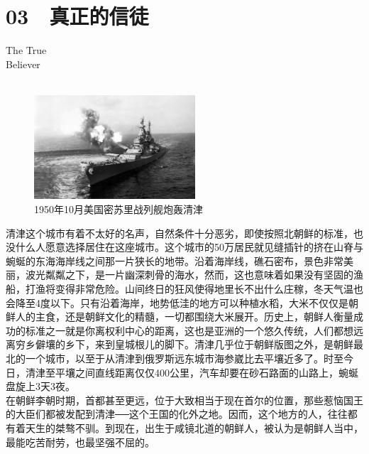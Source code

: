 \fancyhead[RO]{{\tiny{\textcolor{Gray}{\FA \ }}}\thepage}
\fancyhead[LE]{{\tiny{\textcolor{Gray}{\FA \ }}}\thepage}
\fancyfoot[LE,RO]{}
\fancyfoot[LO,CE]{}
\fancyfoot[CO,RE]{}
\chapter*{03 {\FA } 真正的信徒}
\vspace{5mm}
\begin{flushright}
	\textcolor{PinYinColor}{\EN \huge{The True\\
		Believer\\
	\ \\}}
\end{flushright}
\begin{figure}[!htbp]
	\centering
	\includegraphics[width=6cm]{./Chapters/Images/03.jpg}
	\caption*{1950年10月美国密苏里战列舰炮轰清津}
\end{figure}

清津这个城市有着不太好的名声，自然条件十分恶劣，即使按照北朝鲜的标准，也没什么人愿意选择居住在这座城市。这个城市的50万居民就见缝插针的挤在山脊与蜿蜒的东海海岸线之间那一片狭长的地带。沿着海岸线，礁石密布，景色非常美丽，波光粼粼之下，是一片幽深刺骨的海水，然而，这也意味着如果没有坚固的渔船，打渔将变得非常危险。山间终日的狂风使得地里长不出什么庄稼，冬天气温也会降至4度以下。只有沿着海岸，地势低洼的地方可以种植水稻，大米不仅仅是朝鲜人的主食，还是朝鲜文化的精髓，一切都围绕大米展开。历史上，朝鲜人衡量成功的标准之一就是你离权利中心的距离，这也是亚洲的一个悠久传统，人们都想远离穷乡僻壤的乡下，来到皇城根儿的脚下。清津几乎位于朝鲜版图之外，是朝鲜最北的一个城市，以至于从清津到俄罗斯远东城市海参崴比去平壤近多了。时至今日，清津至平壤之间直线距离仅仅400公里，汽车却要在砂石路面的山路上，蜿蜒盘旋上3天3夜。\\

在朝鲜李朝时期，首都甚至更远，位于大致相当于现在首尔的位置，那些惹恼国王的大臣们都被发配到清津──这个王国的化外之地。因而，这个地方的人，往往都有着天生的桀骜不驯。到现在，出生于咸镜北道的朝鲜人，被认为是朝鲜人当中，最能吃苦耐劳，也最坚强不屈的。\\

